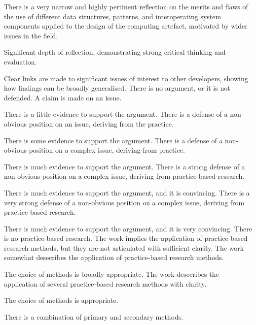 \documentclass{../../fal_assignment}
\begin{document}
\begin{markingrubric}
	\grade There is a very narrow and highly pertinent reflection on the merits and flaws of the use of different data structures, patterns, and interoperating system components applied to the design of the computing artefact, motivated by wider issues in the field.
	\par Significant depth of reflection, demonstrating strong critical thinking and evaluation.
	\par Clear links are made to significant issues of interest to other developers, showing how findings can be broadly generalised. 
%
        \grade\fail There is no argument, or it is not defended.
        \grade A claim is made on an issue.
            \par There is a little evidence to support the argument.
        \grade There is a defense of a non-obvious position on an issue, deriving from the practice.
            \par There is some evidence to support the argument.
        \grade There is a defense of a non-obvious position on a complex issue, deriving from practice.
            \par There is much evidence to support the argument.
        \grade There is a strong defense of a non-obvious position on a complex issue, deriving from practice-based research.
            \par There is much evidence to support the argument, and it is convincing.
        \grade There is a very strong defense of a non-obvious position on a complex issue, deriving from practice-based research.
            \par There is much evidence to support the argument, and it is very convincing.
%
        \grade\fail There is no practice-based research.
        \grade The work implies the application of practice-based research methods, but they are not articulated with sufficient clarity.
        \grade The work somewhat desecribes the application of practice-based research methods.
            \par The choice of methods is broadly appropriate.
        \grade The work desecribes the application of several practice-based research methods with clarity.
            \par The choice of methods is appropriate.
            \par There is a combination of primary and secondary methods.

\end{markingrubric}
\end{document}
